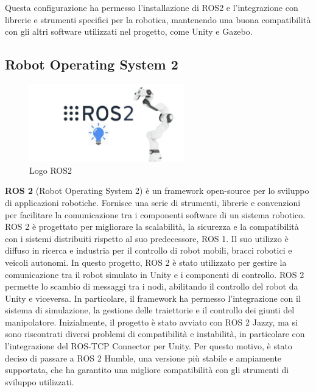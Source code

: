\documentclass[11pt]{report}
\begin{document}
Questa configurazione ha permesso l’installazione di ROS2 e l’integrazione con librerie e strumenti specifici per la robotica, mantenendo una buona compatibilità con gli altri software utilizzati nel progetto, come Unity e Gazebo.





\subsection{Robot Operating System 2}

\begin{figure}[H]
    \centering
    \includegraphics[width=0.6\textwidth]{images/ROS2.png}
    \caption{Logo ROS2}
    \label{fig:ROS2}
\end{figure}

\textbf{ROS 2} (Robot Operating System 2) \cite{ROS2} è un framework open-source per lo sviluppo di applicazioni robotiche. Fornisce una serie di strumenti, librerie e convenzioni per facilitare la comunicazione tra i componenti software di un sistema robotico. ROS 2 è progettato per migliorare la scalabilità, la sicurezza e la compatibilità con i sistemi distribuiti rispetto al suo predecessore, ROS 1. Il suo utilizzo è diffuso in ricerca e industria per il controllo di robot mobili, bracci robotici e veicoli autonomi.
In questo progetto, ROS 2 è stato utilizzato per gestire la comunicazione tra il robot simulato in Unity e i componenti di controllo. ROS 2 permette lo scambio di messaggi tra i nodi, abilitando il controllo del robot da Unity e viceversa. In particolare, il framework ha permesso l'integrazione con il sistema di simulazione, la gestione delle traiettorie e il controllo dei giunti del manipolatore.
Inizialmente, il progetto è stato avviato con ROS 2 Jazzy, ma si sono riscontrati diversi problemi di compatibilità e instabilità, in particolare con l'integrazione del ROS-TCP Connector per Unity. Per questo motivo, è stato deciso di passare a ROS 2 Humble, una versione più stabile e ampiamente supportata, che ha garantito una migliore compatibilità con gli strumenti di sviluppo utilizzati.
\end{document}
